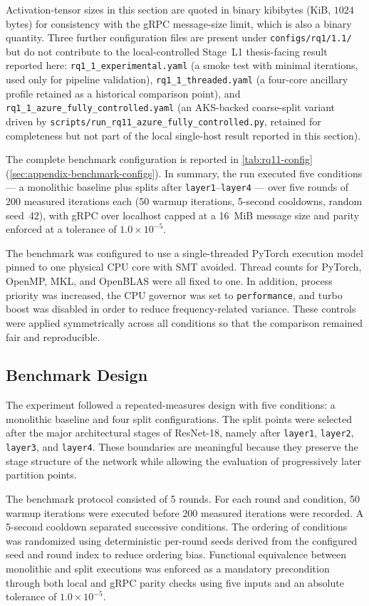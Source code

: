 Activation-tensor sizes in this section are quoted in binary kibibytes (KiB, $1024$ bytes) for consistency with the gRPC message-size limit, which is also a binary quantity. Three further configuration files are present under \texttt{configs/rq1/1.1/} but do not contribute to the local-controlled Stage~L1 thesis-facing result reported here: \texttt{rq1\_1\_experimental.yaml} (a smoke test with minimal iterations, used only for pipeline validation), \texttt{rq1\_1\_threaded.yaml} (a four-core ancillary profile retained as a historical comparison point), and \texttt{rq1\_1\_azure\_fully\_controlled.yaml} (an AKS-backed coarse-split variant driven by \texttt{scripts/run\_rq11\_azure\_fully\_controlled.py}, retained for completeness but not part of the local single-host result reported in this section).

The complete benchmark configuration is reported in
\cref{tab:rq11-config} (\cref{sec:appendix-benchmark-configs}). In summary, the
run executed five conditions --- a monolithic baseline plus splits after
\texttt{layer1}--\texttt{layer4} --- over five rounds of 200 measured iterations
each (50 warmup iterations, 5-second cooldowns, random seed~42), with gRPC over
localhost capped at a 16~MiB message size and parity enforced at a tolerance of
$1.0 \times 10^{-5}$.

The benchmark was configured to use a single-threaded PyTorch execution model pinned to one physical CPU core with SMT avoided. Thread counts for PyTorch, OpenMP, MKL, and OpenBLAS were all fixed to one. In addition, process priority was increased, the CPU governor was set to \texttt{performance}, and turbo boost was disabled in order to reduce frequency-related variance. These controls were applied symmetrically across all conditions so that the comparison remained fair and reproducible.

\subsection{Benchmark Design}
The experiment followed a repeated-measures design with five conditions: a monolithic baseline and four split configurations. The split points were selected after the major architectural stages of ResNet-18, namely after \texttt{layer1}, \texttt{layer2}, \texttt{layer3}, and \texttt{layer4}. These boundaries are meaningful because they preserve the stage structure of the network while allowing the evaluation of progressively later partition points.

The benchmark protocol consisted of 5 rounds. For each round and condition, 50 warmup iterations were executed before 200 measured iterations were recorded. A 5-second cooldown separated successive conditions. The ordering of conditions was randomized using deterministic per-round seeds derived from the configured seed and round index to reduce ordering bias. Functional equivalence between monolithic and split executions was enforced as a mandatory precondition through both local and gRPC parity checks using five inputs and an absolute tolerance of $1.0 \times 10^{-5}$.

